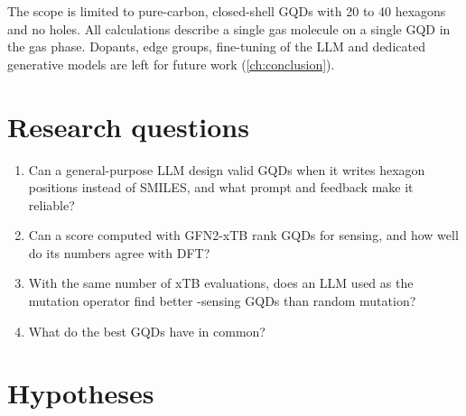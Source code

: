 The scope is limited to pure-carbon, closed-shell GQDs with 20 to 40 hexagons and no holes. All
calculations describe a single gas molecule on a single GQD in the gas phase. Dopants, edge groups,
fine-tuning of the LLM and dedicated generative models are left for future work
(\cref{ch:conclusion}).

\section{Research questions}
\label{sec:rq}

\begin{enumerate}[label=\textbf{RQ\arabic*.},leftmargin=*]
  \item Can a general-purpose LLM design valid GQDs when it writes hexagon positions instead of
        SMILES, and what prompt and feedback make it reliable?
  \item Can a score computed with GFN2-xTB rank GQDs for  sensing, and how well do its
        numbers agree with DFT?
  \item With the same number of xTB evaluations, does an LLM used as the mutation operator find
        better -sensing GQDs than random mutation?
  \item What do the best GQDs have in common?
\end{enumerate}

\section{Hypotheses}
\label{sec:hypotheses}

